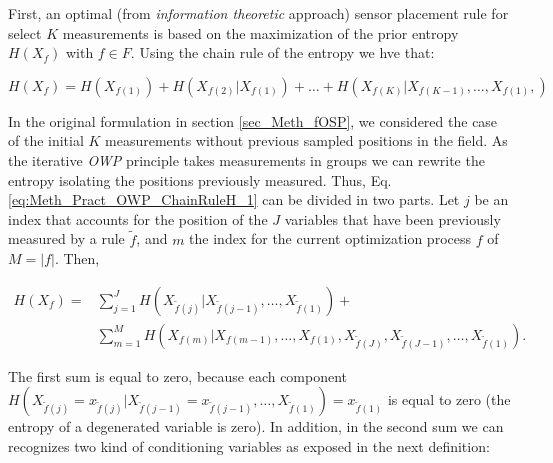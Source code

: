 First, an optimal (from \emph{information theoretic} approach) sensor placement rule for select $K$ measurements is based on the maximization of the prior entropy $H(X_f)$ with $f \in F$. Using the chain rule of the entropy we hve that:


\begin{equation}\label{eq:Meth_Pract_OWP_ChainRuleH_1}
	H(X_f) = H(X_{f(1)}) + H(X_{f(2)}|X_{f(1)}) + \ldots + H(X_{f(K)}|X_{f(K-1)}, \ldots ,X_{f(1)} , )
\end{equation}

In the original formulation in section \ref{sec_Meth_fOSP}, we considered the case of the initial $K$ measurements without previous sampled positions in the field. As the iterative \emph{OWP} principle takes measurements in groups we can rewrite the entropy isolating the positions previously measured. Thus, Eq. \eqref{eq:Meth_Pract_OWP_ChainRuleH_1} can be divided in two parts. Let $j$ be an index that accounts for the position of the $J$ variables that have been previously measured by a rule $\widetilde{f}$, and $m$ the index for the current optimization process $f$ of $M = |f|$. Then,  %


\begin{align}\label{eq:Meth_Pract_OWP_ChainRuleH_2}
H(X_f) = & \sum_{j=1}^{J} H(X_{\widetilde{f}{(j)}} | X_{\widetilde{f}{(j-1)}},\ldots,X_{\widetilde{f}{(1)}}) + \nonumber \\
         & \sum_{m = 1}^{M}H(X_{f(m)} | X_{f(m-1)},\ldots,X_{f(1)},   X_{\widetilde{f}{(J)}},X_{\widetilde{f}{(J-1)}},\ldots,X_{\widetilde{f}{(1)}} ) .
\end{align}



The first sum is equal to zero, because each component $H(X_{\widetilde{f}{(j)}} = x_{\widetilde{f}{(j)}} | X_{\widetilde{f}{(j-1)}} = x_{\widetilde{f}{(j-1)}},\ldots,X_{\widetilde{f}{(1)}}) = x_{\widetilde{f}{(1)}}$ is equal to zero (the entropy of a degenerated variable is zero). In addition, in the second sum we can recognizes two kind of conditioning variables as exposed in the next definition:

